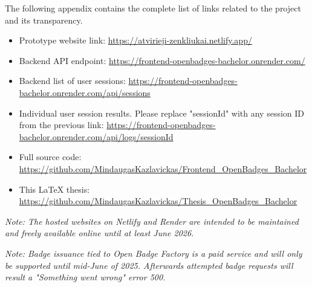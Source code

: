 The following appendix contains the complete list of links related to the project and its transparency.

\vspace{0.5em}
\begin{itemize}
  \item Prototype website link: \url{https://atvirieji-zenkliukai.netlify.app/}
  \item Backend API endpoint: \url{https://frontend-openbadges-bachelor.onrender.com/}
  \item Backend list of user sessions: \url{https://frontend-openbadges-bachelor.onrender.com/api/sessions}
  \item Individual user session results. Please replace "sessionId" with any session ID from the previous link: \url{https://frontend-openbadges-bachelor.onrender.com/api/logs/sessionId}
  \item Full source code: \url{https://github.com/MindaugasKazlavickas/Frontend_OpenBadges_Bachelor}
  \item This LaTeX thesis: \url{https://github.com/MindaugasKazlavickas/Thesis_OpenBadges_Bachelor}
\end{itemize}

\textit{Note: The hosted websites on Netlify and Render are intended to be maintained and freely available online until at least June 2026.}

\textit{Note: Badge issuance tied to Open Badge Factory is a paid service and will only be supported until mid-June of 2025. Afterwards attempted badge requests will result a "Something went wrong" error 500.}